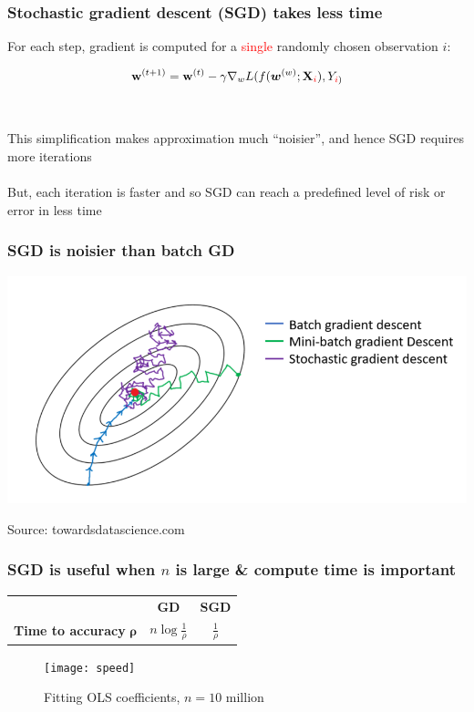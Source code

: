 \documentclass{beamer}
\begin{document}
\begin{frame}
	\frametitle{Stochastic gradient descent (SGD) takes less time}

	For each step, gradient is computed for a \textcolor{red}{single} randomly
	chosen observation $i$:

	$$
	{\mathbf{w}^{(t+1)}} = \mathbf{w}^{(t)} - \gamma \nabla_w
	L(f(\bm{w}^{(w)}; \mathbf{X}_{\textcolor{red}{i}}), Y_{\textcolor{red}{i})}
	$$ \\~\\

	This simplification makes approximation much ``noisier'', and hence SGD
	requires more iterations \\~\\

	But, each iteration is faster and so SGD can reach a predefined
	level of risk or error in less time
\end{frame}

\begin{frame}
\frametitle{SGD is noisier than batch GD}
	\centering
	\includegraphics[scale=0.3]{noise}

	\tiny Source: towardsdatascience.com
\end{frame}

\begin{frame}
	\frametitle{SGD is useful when $n$ is large \& compute
	time is important}
	\begin{table}[t]
		\begin{tabular}{|l|c|c|}
			\hline
			& \textbf{GD} & \textbf{SGD} \\
			\textbf{Time to accuracy} $\mathbf{\rho}$ & $n \log
			\frac{1}{\rho}$ & $\frac{1}{\rho}$ \\
			\hline
		\end{tabular}
	\end{table}

	\begin{figure}
		\caption{Fitting OLS coefficients, $n=10$ million}
	\centering
	\texttt{[image: speed]}
	\end{figure}

			
\end{frame}
\end{document}
